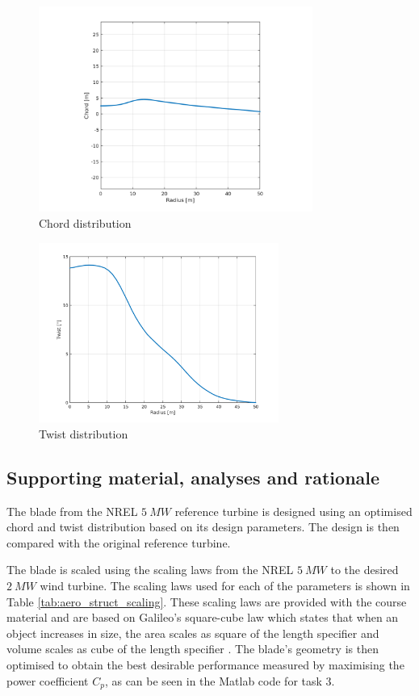 \begin{figure}[H]
\centering
\includegraphics[width=0.8\textwidth]{Images/chord.png} 
\caption{Chord distribution}\label{fig:chord}
\end{figure}

\begin{figure}[H]
\centering
\includegraphics[width=0.7\textwidth]{Images/twist.png} 
\caption{Twist distribution}\label{fig:twist}
\end{figure}


\subsection{Supporting material, analyses and rationale}
The blade from the NREL $5\ MW$ reference turbine \cite{5MW} is designed using an optimised chord and twist distribution based on its design parameters. The design is then compared with the original reference turbine.

The blade is scaled using the scaling laws from the NREL $5\ MW$ to the desired $2\ MW$ wind turbine. The scaling laws used for each of the parameters is shown in Table \ref{tab:aero_struct_scaling}. These scaling laws are provided with the course material \cite{scaling_laws} and are based on Galileo's square-cube law which states that when an object increases in size, the area scales as square of the length specifier and volume scales as cube of the length specifier \cite{galileo}. The blade's geometry is then optimised to obtain the best desirable performance measured by maximising the power coefficient $C_p$, as can be seen in the Matlab code for task 3.

